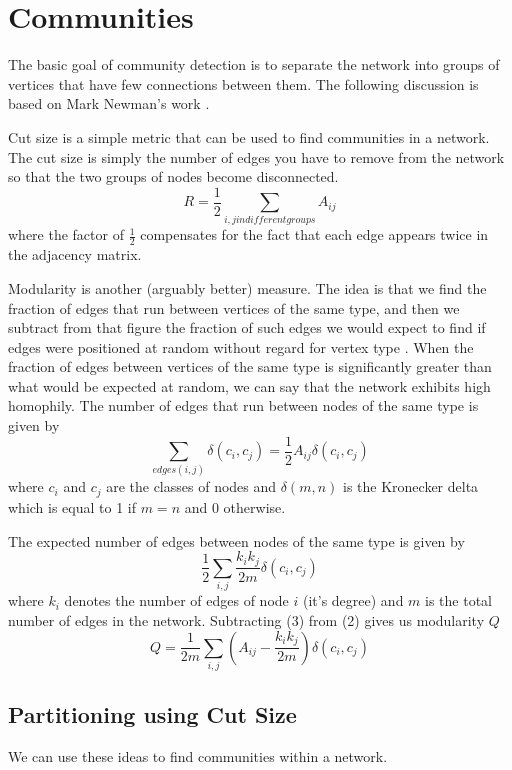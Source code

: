\documentclass[12pt]{article}
\begin{document}
\newpage
\section{Communities} The basic goal of community detection is to separate the network into groups of vertices that have few connections between them. The following discussion is based on Mark Newman's work \cite{newman}. 

	
	Cut size is a simple metric that can be used to find communities in a network. The cut size is simply the number of edges you have to remove from the network so that the two groups of nodes become disconnected. 
	\begin{equation}
		R = \frac{1}{2} \sum_{i,j in different groups} A_{ij}
	\end{equation}
	where the factor of $\frac{1}{2}$ compensates for the fact that each edge appears twice in the adjacency matrix.

	Modularity is another (arguably better) measure. The idea is that we find  the fraction of edges that run between vertices of the same type, and then we subtract from that figure the fraction of such edges we would expect to find if edges were positioned at random without regard for vertex type \cite{newman}. When the fraction of edges between vertices of the same type is significantly greater than what would be expected at random, we can say that the network exhibits high homophily. The number of edges that run between nodes of the same type is given by
	\begin{equation}
		\sum_{edges (i,j)} \delta (c_i, c_j) = \frac{1}{2} A_{ij} \delta (c_i, c_j)
	\end{equation}
	where $c_i$ and $c_j$ are the classes of nodes and $\delta (m,n)$ is the Kronecker delta which is equal to 1 if $m = n$ and 0 otherwise.
	
	
	The expected number of edges between nodes of the same type is given by
	\begin{equation}
		\frac{1}{2} \sum_{i,j} \frac{k_i k_j}{2m} \delta (c_i,c_j)
	\end{equation}
	where $k_i$ denotes the number of edges of node $i$ (it's degree) and $m$ is the total number of edges in the network. Subtracting (3) from (2) gives us modularity $Q$
	\begin{equation}
		Q = \frac{1}{2m} \sum_{i,j} \left( A_{ij} - \frac{k_i k_j}{2m} \right) \delta (c_i,c_j)
	\end{equation}

	\subsection{Partitioning using Cut Size} 
	We can use these ideas to find communities within a network.  
	
\end{document}
